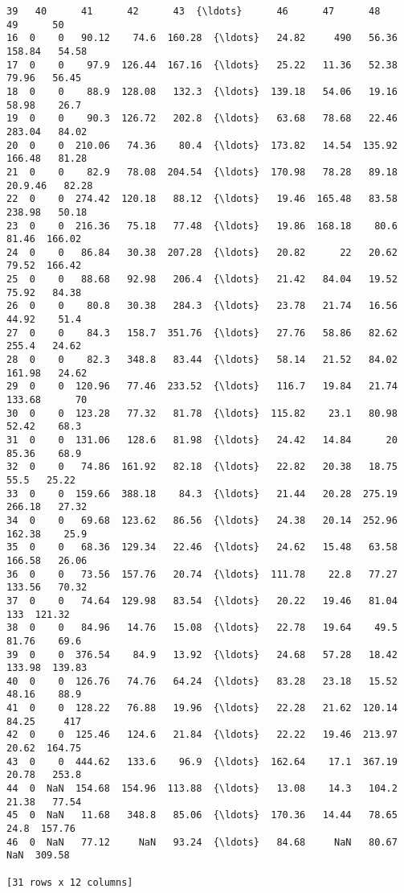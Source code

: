 \documentclass[11pt]{article}
\makeatletter
\newcommand{\boxspacing}{\kern\kvtcb@left@rule\kern\kvtcb@boxsep}
\newcommand{\prompt}[4]{
        \ttfamily\llap{{\color{#2}[#3]:\hspace{3pt}#4}}\vspace{-\baselineskip}
    }
\makeatother
\begin{document}
            \begin{tcolorbox}[breakable, size=fbox, boxrule=.5pt, pad at break*=1mm, opacityfill=0]
\prompt{Out}{outcolor}{0}{\boxspacing}
\begin{Verbatim}[commandchars=\\\{\}]
   39   40      41      42      43  {\ldots}      46      47      48       49      50
16  0    0   90.12    74.6  160.28  {\ldots}   24.82     490   56.36   158.84   54.58
17  0    0    97.9  126.44  167.16  {\ldots}   25.22   11.36   52.38    79.96   56.45
18  0    0    88.9  128.08   132.3  {\ldots}  139.18   54.06   19.16    58.98    26.7
19  0    0    90.3  126.72   202.8  {\ldots}   63.68   78.68   22.46   283.04   84.02
20  0    0  210.06   74.36    80.4  {\ldots}  173.82   14.54  135.92   166.48   81.28
21  0    0    82.9   78.08  204.54  {\ldots}  170.98   78.28   89.18  20.9.46   82.28
22  0    0  274.42  120.18   88.12  {\ldots}   19.46  165.48   83.58   238.98   50.18
23  0    0  216.36   75.18   77.48  {\ldots}   19.86  168.18    80.6    81.46  166.02
24  0    0   86.84   30.38  207.28  {\ldots}   20.82      22   20.62    79.52  166.42
25  0    0   88.68   92.98   206.4  {\ldots}   21.42   84.04   19.52    75.92   84.38
26  0    0    80.8   30.38   284.3  {\ldots}   23.78   21.74   16.56    44.92    51.4
27  0    0    84.3   158.7  351.76  {\ldots}   27.76   58.86   82.62    255.4   24.62
28  0    0    82.3   348.8   83.44  {\ldots}   58.14   21.52   84.02   161.98   24.62
29  0    0  120.96   77.46  233.52  {\ldots}   116.7   19.84   21.74   133.68      70
30  0    0  123.28   77.32   81.78  {\ldots}  115.82    23.1   80.98    52.42    68.3
31  0    0  131.06   128.6   81.98  {\ldots}   24.42   14.84      20    85.36    68.9
32  0    0   74.86  161.92   82.18  {\ldots}   22.82   20.38   18.75     55.5   25.22
33  0    0  159.66  388.18    84.3  {\ldots}   21.44   20.28  275.19   266.18   27.32
34  0    0   69.68  123.62   86.56  {\ldots}   24.38   20.14  252.96   162.38    25.9
35  0    0   68.36  129.34   22.46  {\ldots}   24.62   15.48   63.58   166.58   26.06
36  0    0   73.56  157.76   20.74  {\ldots}  111.78    22.8   77.27   133.56   70.32
37  0    0   74.64  129.98   83.54  {\ldots}   20.22   19.46   81.04      133  121.32
38  0    0   84.96   14.76   15.08  {\ldots}   22.78   19.64    49.5    81.76    69.6
39  0    0  376.54    84.9   13.92  {\ldots}   24.68   57.28   18.42   133.98  139.83
40  0    0  126.76   74.76   64.24  {\ldots}   83.28   23.18   15.52    48.16    88.9
41  0    0  128.22   76.88   19.96  {\ldots}   22.28   21.62  120.14    84.25     417
42  0    0  125.46   124.6   21.84  {\ldots}   22.22   19.46  213.97    20.62  164.75
43  0    0  444.62   133.6    96.9  {\ldots}  162.64    17.1  367.19    20.78   253.8
44  0  NaN  154.68  154.96  113.88  {\ldots}   13.08    14.3   104.2    21.38   77.54
45  0  NaN   11.68   348.8   85.06  {\ldots}  170.36   14.44   78.65     24.8  157.76
46  0  NaN   77.12     NaN   93.24  {\ldots}   84.68     NaN   80.67      NaN  309.58

[31 rows x 12 columns]
\end{Verbatim}
\end{tcolorbox}
        
\end{document}
